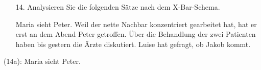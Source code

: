 \begin{frame}
	
\begin{itemize}
	\item[14.] Analysieren Sie die folgenden Sätze nach dem X-Bar-Schema.
		
	\begin{exe}
			
		\begin{xlist}		
			\ex Maria sieht Peter.
			\ex Weil der nette Nachbar konzentriert gearbeitet hat, hat er erst an dem Abend Peter getroffen.
			\ex Über die Behandlung der zwei Patienten haben bis gestern die Ärzte diskutiert.
			\ex Luise hat gefragt, ob Jakob kommt.
		\end{xlist}
	
	\end{exe}
		
	\end{itemize}

\end{frame}

\begin{frame}
	
(14a): Maria sieht Peter.
		
	\centering

\end{frame}


